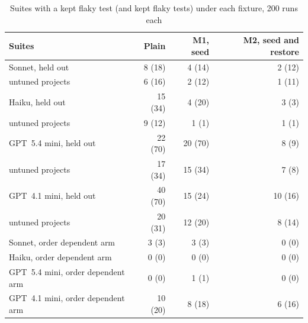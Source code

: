 \begin{table}[htbp]
\caption{Suites with a kept flaky test (and kept flaky tests) under each fixture, 200 runs each}
\label{tab:fixtures}
\small
\setlength{\tabcolsep}{3pt}
\begin{tabularx}{\columnwidth}{Xrrr}
\toprule
Suites & Plain & M1, seed & M2, seed and restore \\
\midrule
Sonnet, held out & 8 (18) & 4 (14) & 2 (12) \\
\quad 21 untuned projects & 6 (16) & 2 (12) & 1 (11) \\
Haiku, held out & 15 (34) & 4 (20) & 3 (3) \\
\quad 21 untuned projects & 9 (12) & 1 (1) & 1 (1) \\
GPT~5.4 mini, held out & 22 (70) & 20 (70) & 8 (9) \\
\quad 21 untuned projects & 17 (34) & 15 (34) & 7 (8) \\
GPT~4.1 mini, held out & 40 (70) & 15 (24) & 10 (16) \\
\quad 21 untuned projects & 20 (31) & 12 (20) & 8 (14) \\
Sonnet, order dependent arm & 3 (3) & 3 (3) & 0 (0) \\
Haiku, order dependent arm & 0 (0) & 0 (0) & 0 (0) \\
GPT~5.4 mini, order dependent arm & 0 (0) & 1 (1) & 0 (0) \\
GPT~4.1 mini, order dependent arm & 10 (20) & 8 (18) & 6 (16) \\
\bottomrule
\end{tabularx}
\end{table}

